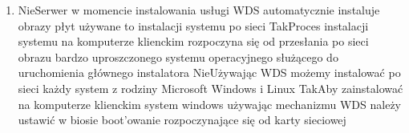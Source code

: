 \begin{enumerate}
		\item {}%
		{Nie}{Serwer w momencie instalowania usługi WDS automatycznie instaluje obrazy płyt używane to instalacji systemu po sieci}%
		{Tak}{Proces instalacji systemu na komputerze klienckim rozpoczyna się od przesłania po sieci obrazu bardzo uproszczonego systemu operacyjnego służącego do uruchomienia głównego instalatora}%
		{Nie}{Używając WDS możemy instalować po sieci każdy system z rodziny Microsoft Windows i Linux}%
		{Tak}{Aby zainstalować na komputerze klienckim system windows używając mechanizmu WDS należy ustawić w biosie boot'owanie rozpoczynające się od karty sieciowej}

				
		
	\end{enumerate}